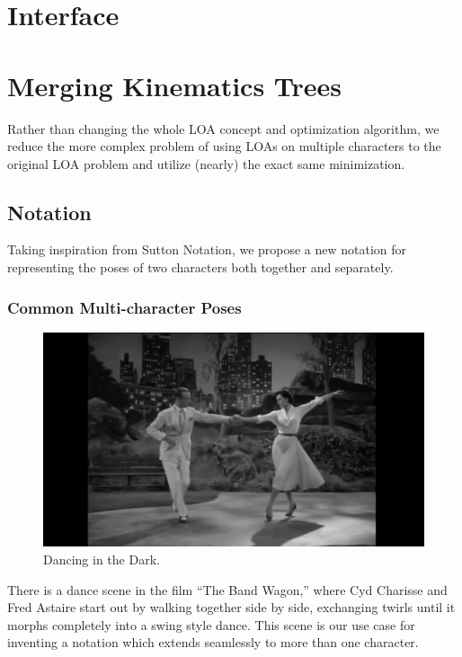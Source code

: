 \section{Interface}


\section{Merging Kinematics Trees}
Rather than changing the whole LOA concept and optimization algorithm, we reduce the more complex problem of using LOAs on multiple characters to the original LOA problem and utilize (nearly) the exact same minimization.

\citep{johnson1975finding}

\subsection{Notation}
Taking inspiration from Sutton Notation, we propose a new notation for representing the poses of two characters both together and separately.

\subsubsection{Common Multi-character Poses}
\begin{figure}
\centering
\includegraphics[scale=0.1]{img/bandwagon}
\caption{Dancing in the Dark.}
\end{figure}

There is a dance scene in the film ``The Band Wagon,'' where Cyd Charisse and Fred Astaire start out by walking together side by side, exchanging twirls until it morphs completely into a swing style dance. This scene is our use case for inventing a notation which extends seamlessly to more than one character.

